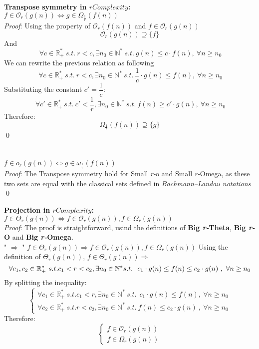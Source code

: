  \textbf{Transpose symmetry in $rComplexity$:}  \\  $ f \in \mathcal{O}_{r}(g(n)) \Leftrightarrow g \in \Omega_{\frac{1}{r}}(f(n)) $
    \\\textit{Proof}:
Using the property of $ \mathcal{O}_{r}(f(n))$ and $f \in \mathcal{O}_{r}(g(n))$
  \[\mathcal{O}_{r}(g(n)) \supseteq \lbrace f \rbrace \]
  And 
  \[ \ \forall c  \in \mathbb{R}^{*}_{+} \ s.t.\  r<c, \exists n_{0} \in \mathbb{N}^{*}\ s.t.\  g(n) \leq c \cdot f(n),\  \forall n \geq n_{0} \]
  We can rewrite the previous relation as following
    \[ \ \forall c  \in \mathbb{R}^{*}_{+} \ s.t.\  r<c, \exists n_{0} \in \mathbb{N}^{*}\ s.t.\  \dfrac{1}{c} \cdot g(n) \leq f(n),\  \forall n \geq n_{0} \]
  Substituting the constant $ c' = \dfrac{1}{c}$: 
      \[ \ \forall c'  \in \mathbb{R}^{*}_{+} \ s.t.\  c' < \dfrac{1}{r}, \exists n_{0} \in \mathbb{N}^{*}\ s.t.\  f(n) \geq c' \cdot g(n) ,\  \forall n \geq n_{0} \]
  Therefore:
  \[\Omega_{\frac{1}{r}}(f(n)) \supseteq \lbrace g \rbrace \]
\qed
 \\  \\  \\  $ f \in o_{r}(g(n)) \Leftrightarrow g \in \omega_{\frac{1}{r}}(f(n)) $
   \\\textit{Proof}:
The Transpose symmetry hold for Small \textit{r-}o and Small \textit{r-}Omega, as these two sets are equal with the classical sets defined in \textit{Bachmann–Landau notations}
\qed
 \hfill\break
 
  \textbf{Projection in $rComplexity$:}  \\  $ f \in \Theta_{r}(g(n)) \Leftrightarrow f \in \mathcal{O}_{r}(g(n)), f \in \Omega_{r}(g(n)) $
   \\\textit{Proof}:
The proof is straightforward, usind the definitions of \textbf{Big \textit{r-}Theta}, \textbf{Big \textit{r-}O} and \textbf{Big \textit{r-}Omega}. \\
" $\Rightarrow$ " $ f \in \Theta_{r}(g(n)) \Rightarrow f \in \mathcal{O}_{r}(g(n)), f \in \Omega_{r}(g(n)) $
 Using the definition of $\Theta_{r}(g(n))$, $ f \in \Theta_{r}(g(n)) \Rightarrow$
  \[\forall c_{1}, c_{2} \in \mathbb{R}^{*}_{+} \ s.t.  c_{1} < r < c_{2} , \exists n_{0} \in \mathbb{N}^{*}\ \\ s.t.\ \ c_{1} \cdot g(n) \leq f(n) \leq c_{2} \cdot g(n)\ ,\  \forall n \geq n_{0} \]
  By splitting the inequality:
  \[\begin{cases} \forall c_{1} \in \mathbb{R}^{*}_{+} \ s.t.  c_{1} < r , \exists n_{0} \in \mathbb{N}^{*}\ s.t.\ \ c_{1} \cdot g(n) \leq f(n) ,\  \forall n \geq n_{0} \\ \forall  c_{2} \in \mathbb{R}^{*}_{+} \ s.t.  r < c_{2} , \exists n_{0} \in \mathbb{N}^{*}\ s.t.\ f(n) \leq c_{2} \cdot g(n)\ ,\  \forall n \geq n_{0} \end{cases}\]
  Therefore:
  \[\begin{cases} f \in \mathcal{O}_{r}(g(n)) \\ f \in \Omega_{r}(g(n)) \end{cases}\]
  
